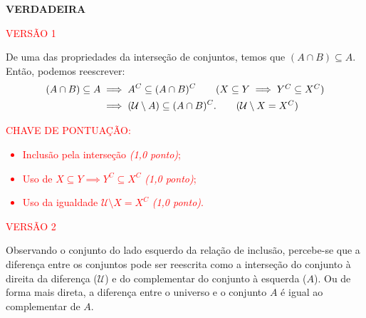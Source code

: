 \textbf{VERDADEIRA}

\textcolor{red}{ VERSÃO 1 } %

    


 
De uma das propriedades da interseção de conjuntos, temos que $(A \cap B) \subseteq A$.
Então, podemos reescrever:
  \begin{align*}
      (A \cap B) \subseteq A &\implies A^{C} \subseteq (A \cap B)^{C} \tag{$X \subseteq Y \implies Y^C \subseteq X^C$} \\
      &\implies (\mathcal{U} \setminus A) \subseteq (A \cap B)^{C}. \tag{$\mathcal{U} \setminus X= X^{C}$}
  \end{align*}

\bigskip

\textcolor{red}{CHAVE DE PONTUAÇÃO:
\begin{itemize}
    \item  Inclusão pela interseção \emph{(1,0 ponto)};
    \item Uso de $X \subseteq Y \implies Y^C \subseteq X^C$ \emph{(1,0 ponto)};
    \item  Uso da igualdade $\mathcal{U} \setminus X= X^{C}$ \emph{(1,0 ponto)}.
\end{itemize} } 

\bigskip




\textcolor{red}{ VERSÃO 2 } %

Observando o conjunto do lado esquerdo da relação de inclusão, percebe-se que a diferença entre os conjuntos pode ser reescrita como a interseção do conjunto à direita da diferença ($\mathcal{U}$) e do complementar do conjunto à esquerda ($A$). Ou de forma mais direta, a diferença entre o universo e o conjunto $A$ é igual ao complementar de $A$.

